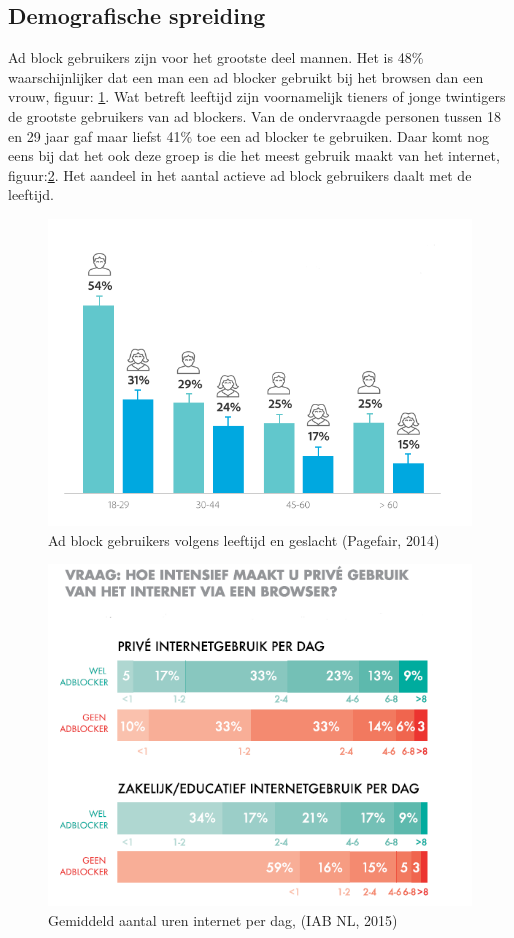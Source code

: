 \documentclass[pdftex,a4paper,12pt,twoside]{report}
\begin{document}
\subsection{Demografische spreiding}
\label{sec Demografische spreiding}
Ad block gebruikers zijn voor het grootste deel mannen. Het is 48\% waarschijnlijker dat een man een ad blocker gebruikt bij het browsen dan een vrouw, figuur: \ref{fig: Demographic_age_sex}. Wat betreft leeftijd zijn voornamelijk tieners of jonge twintigers de grootste gebruikers van ad blockers. Van de ondervraagde personen tussen 18 en 29 jaar gaf maar liefst 41\% toe een ad blocker te gebruiken. Daar komt nog eens bij dat het ook deze groep is die het meest gebruik maakt van het internet, figuur:\ref{fig: adbvsnadbHoursofIntertnet}. Het aandeel in het aantal actieve ad block gebruikers daalt met de leeftijd.

\begin{figure}[p]
\centering
\includegraphics[width=12cm]{img/demographicsMV}
\caption{Ad block gebruikers volgens leeftijd en geslacht (Pagefair, 2014) }
\label{fig: Demographic_age_sex}
\end{figure}

\begin{figure}[p]
\centering
\includegraphics[width=12cm]{img/adbvsnadbHoursofIntertnet}
\caption{Gemiddeld aantal uren internet per dag, (IAB NL, 2015) }
\label{fig: adbvsnadbHoursofIntertnet}
\end{figure}
\end{document}
